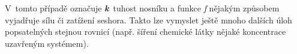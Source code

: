 V~tomto případě označuje \emph{\textbf{k}}~tuhost nosníku a funkce
\emph{f} nějakým způsobem vyjadřuje sílu či zatížení seshora. Takto lze
vymyslet ještě mnoho dalších úloh popsatelných stejnou rovnicí (např.
šíření chemické látky nějaké koncentrace uzavřeným systémem).
% 
% 
% 
% 
% 
% 
% 
% 
% 
% 
% 
% 
% 
